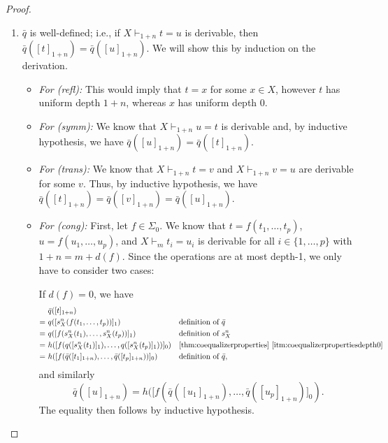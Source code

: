 \documentclass[a4paper,UKenglish,cleveref,thm-restate,numberwithinsect,final]{lipics-v2021}
\newcommand{\sigp}{\Sigma_0}
\newcommand{\supp}{\mathsf{supp}}
\theoremstyle{plain}
\numberwithin{equation}{section}
\newcommand{\+}[1]{\mathcal{#1}\xspace}
\theoremstyle{definition}
\begin{document}
\begin{proof}
\begin{enumerate}[wide]
            Furthermore, it follows by equivariance of \(s^n_X\), the canonical projection, and \(q\), that
            \[
                \supp(\bar{q}([t]_{1 + n})) = \supp(q([s^n_X(t)]_1)) \subseteq \supp(t).
            \]
        \item \label{itm:coequalizerwelldefinedness}
            \(\bar{q}\) is well-defined; i.e., if \(X \vdash_{1 + n} t = u\) is derivable, then \(\bar{q}([t]_{1 + n}) = \bar{q}([u]_{1 + n})\).
            We will show this by induction on the derivation.
            \begin{itemize}
                \item
                    \textit{For (refl):}
                    This would imply that \(t = x\) for some \(x \in X\), however \(t\) has uniform depth \(1 + n\), whereas \(x\) has uniform depth \(0\).
                \item
                    \textit{For (symm):}
                    We know that \(X \vdash_{1 + n} u = t\) is derivable and, by inductive hypothesis, we have \(\bar{q}([u]_{1 + n}) = \bar{q}([t]_{1 + n})\).
                \item
                    \textit{For (trans):}
                    We know that \(X \vdash_{1 + n} t = v\) and \(X \vdash_{1 + n} v = u\) are derivable for some \(v\).
                    Thus, by inductive hypothesis, we have \(\bar{q}([t]_{1 + n}) = \bar{q}([v]_{1 + n}) = \bar{q}([u]_{1 + n})\).
                \item
                    \textit{For (cong):} First, let $f\in\sigp$.
                    We know that \(t = f(t_1, \ldots, t_p)\), \(u = f(u_1, \ldots, u_p)\), and \(X \vdash_m t_i = u_i\) is derivable for all \(i \in \{1, \ldots, p\}\) with \(1 + n = m + d(f)\).
                    Since the operations are at most depth-1, we only have to consider two cases:

                    If \(d(f) = 0\), we have
                    \begin{align*}
                        &\bar{q}([t]_{1 + n}) \\
                        =~&q([s^n_X(f(t_1, \ldots, t_p))]_1) && \text{definition of } \bar{q} \\
                        =~&q([f(s^n_X(t_1), \ldots, s^n_X(t_p))]_1) && \text{definition of } s^n_X \\
                        =~&h([f(q([s^n_X(t_1)]_1), \ldots, q([s^n_X(t_p)]_1))]_0) && \text{\cref{thm:coequalizerproperties} \eqref{itm:coequalizerpropertiesdepth0}} \\
                        =~&h([f(\bar{q}([t_1]_{1 + n}), \ldots, \bar{q}([t_p]_{1 + n}))]_0) && \text{definition of } \bar{q},
                    \end{align*}
                    and similarly
                    \[
                        \bar{q}([u]_{1 + n}) = h([f(\bar{q}([u_1]_{1 + n}), \ldots, \bar{q}([u_p]_{1 + n})]_0).
                    \]
                    The equality then follows by inductive hypothesis.


\end{itemize}
\end{enumerate}
\end{proof}
\end{document}

